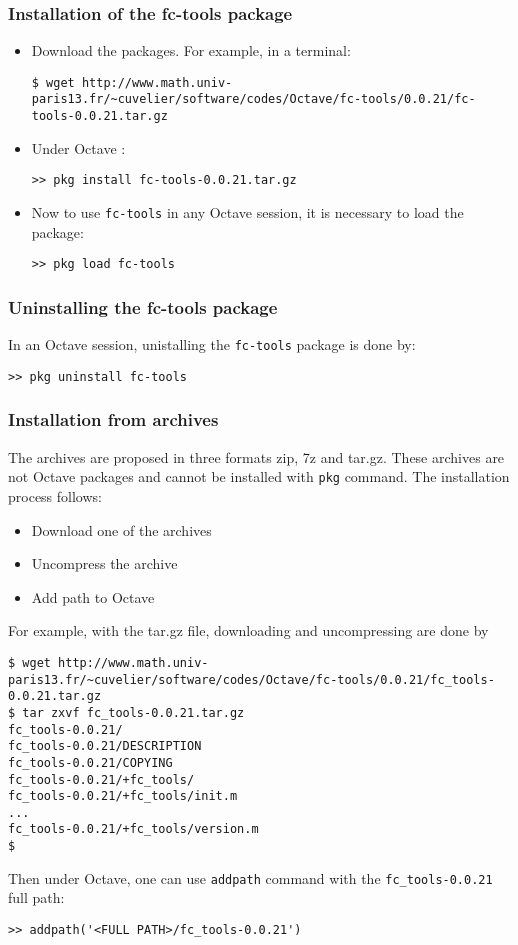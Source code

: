 \subsubsection{Installation of the fc-tools package}

\begin{itemize}
\item Download the packages. For example, in a terminal:
\begin{verbatim}
$ wget http://www.math.univ-paris13.fr/~cuvelier/software/codes/Octave/fc-tools/0.0.21/fc-tools-0.0.21.tar.gz
\end{verbatim}
\item Under Octave :
\begin{verbatim}
>> pkg install fc-tools-0.0.21.tar.gz
\end{verbatim}
\item Now to use \texttt{fc-tools} in any Octave session, it is necessary to load the package:
\begin{verbatim}
>> pkg load fc-tools
\end{verbatim}
\end{itemize}

\subsubsection{Uninstalling the fc-tools package}
In an Octave session, unistalling the \texttt{fc-tools} package is done by:
\begin{verbatim}
>> pkg uninstall fc-tools
\end{verbatim}

\subsubsection{Installation from archives}
The archives are proposed in three formats zip, 7z and tar.gz. These archives are not Octave packages and cannot be installed with \texttt{pkg} command.
The installation process follows:
\begin{itemize}
\item Download one of the archives
\item Uncompress the archive
\item Add path to Octave
\end{itemize}

For example, with the tar.gz file, downloading and uncompressing are done by 
\begin{verbatim}
$ wget http://www.math.univ-paris13.fr/~cuvelier/software/codes/Octave/fc-tools/0.0.21/fc_tools-0.0.21.tar.gz
$ tar zxvf fc_tools-0.0.21.tar.gz
fc_tools-0.0.21/
fc_tools-0.0.21/DESCRIPTION
fc_tools-0.0.21/COPYING
fc_tools-0.0.21/+fc_tools/
fc_tools-0.0.21/+fc_tools/init.m
...
fc_tools-0.0.21/+fc_tools/version.m
$
\end{verbatim}
Then under Octave, one can use \texttt{addpath} command with the \texttt{fc_tools-0.0.21} full path:
\begin{verbatim}
>> addpath('<FULL PATH>/fc_tools-0.0.21')
\end{verbatim}
 
